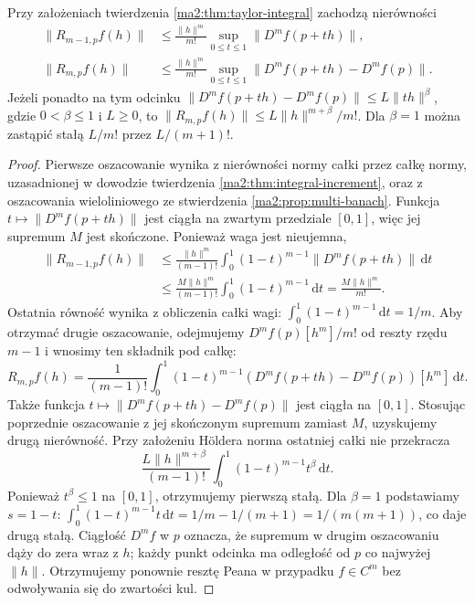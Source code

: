 \begin{wniosek}
\label{ma2:cor:taylor-integral-bounds}
Przy założeniach twierdzenia \ref{ma2:thm:taylor-integral}
zachodzą nierówności
\[
\begin{aligned}
 \|R_{m-1,p}f(h)\|&\le
 \frac{\|h\|^m}{m!}\sup_{0\le t\le1}\|D^mf(p+th)\|,\\
 \|R_{m,p}f(h)\|&\le
 \frac{\|h\|^m}{m!}\sup_{0\le t\le1}
               \|D^mf(p+th)-D^mf(p)\|.
\end{aligned}
\]
Jeżeli ponadto na tym odcinku
$\|D^mf(p+th)-D^mf(p)\|\le L\|th\|^\beta$,
gdzie $0<\beta\le1$ i $L\ge0$, to
$\|R_{m,p}f(h)\|\le L\|h\|^{m+\beta}/m!$.
Dla $\beta=1$ można zastąpić stałą $L/m!$ przez $L/(m+1)!$.
\end{wniosek}
\begin{proof}
Pierwsze oszacowanie wynika z nierówności normy całki
przez całkę normy, uzasadnionej w dowodzie twierdzenia
\ref{ma2:thm:integral-increment}, oraz z oszacowania
wieloliniowego ze stwierdzenia \ref{ma2:prop:multi-banach}.
Funkcja $t\mapsto\|D^mf(p+th)\|$ jest ciągła
na zwartym przedziale $[0,1]$, więc jej supremum
$M$ jest skończone. Ponieważ waga jest nieujemna,
\[
\begin{aligned}
 \|R_{m-1,p}f(h)\|
 &\le\frac{\|h\|^m}{(m-1)!}
       \int_0^1(1-t)^{m-1}\|D^mf(p+th)\|\,\mathrm dt\\
 &\le\frac{M\|h\|^m}{(m-1)!}
       \int_0^1(1-t)^{m-1}\,\mathrm dt
 =\frac{M\|h\|^m}{m!}.
\end{aligned}
\]
Ostatnia równość wynika z obliczenia całki wagi:
$\int_0^1(1-t)^{m-1}\,\mathrm dt=1/m$.
Aby otrzymać drugie oszacowanie, odejmujemy
$D^mf(p)[h^m]/m!$ od reszty rzędu $m-1$ i wnosimy
ten składnik pod całkę:
\[
 R_{m,p}f(h)=\frac{1}{(m-1)!}\int_0^1(1-t)^{m-1}
 (D^mf(p+th)-D^mf(p))[h^m]\,\mathrm dt .
\]
Także funkcja $t\mapsto\|D^mf(p+th)-D^mf(p)\|$
jest ciągła na $[0,1]$. Stosując poprzednie oszacowanie
z jej skończonym supremum zamiast $M$, uzyskujemy
drugą nierówność. Przy założeniu Höldera norma ostatniej całki nie przekracza
\[
 \frac{L\|h\|^{m+\beta}}{(m-1)!}
       \int_0^1(1-t)^{m-1}t^\beta\,\mathrm dt .
\]
Ponieważ $t^\beta\le1$ na $[0,1]$, otrzymujemy
pierwszą stałą. Dla $\beta=1$ podstawiamy $s=1-t$:
$\int_0^1 (1-t)^{m-1}t\,\mathrm dt
=1/m-1/(m+1)=1/(m(m+1))$, co daje drugą stałą.
Ciągłość $D^mf$ w $p$ oznacza, że supremum
w drugim oszacowaniu dąży do zera wraz z $h$;
każdy punkt odcinka ma odległość od $p$ co najwyżej
$\|h\|$. Otrzymujemy ponownie resztę Peana w przypadku
$f\in C^m$ bez odwoływania się do zwartości kul.
\end{proof}

